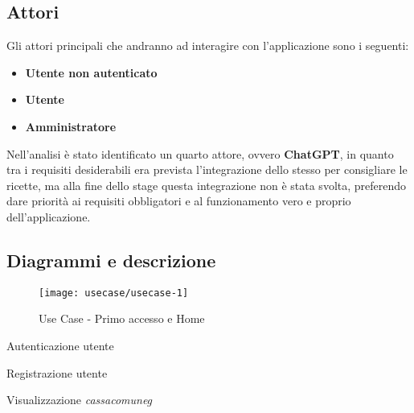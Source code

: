 \subsection{Attori}
Gli attori principali che andranno ad interagire con l'applicazione sono i seguenti:
\begin{itemize}
    \item \textbf{Utente non autenticato}
    \item \textbf{Utente}
    \item \textbf{Amministratore}
\end{itemize}
Nell'analisi è stato identificato un quarto attore, ovvero \textbf{ChatGPT}, in quanto tra i requisiti desiderabili era prevista l'integrazione dello stesso per consigliare le ricette, ma alla fine dello stage questa integrazione non è stata svolta, preferendo dare priorità ai requisiti obbligatori e al funzionamento vero e proprio dell'applicazione.

\newpage

\subsection{Diagrammi e descrizione}

\begin{figure}[!h] 
    \centering 
    \texttt{[image: usecase/usecase-1]} 
    \caption{Use Case - Primo accesso e Home}
\end{figure}

\begin{usecase}{1}{Autenticazione utente}
    \label{uc:autenticazione-utente}
\end{usecase}

\begin{usecase}{2}{Registrazione utente}
    \label{uc:registrazione-utente}
\end{usecase}

\begin{usecase}{3}{Visualizzazione \emph{\gls{cassacomuneg}}}
    \label{uc:visualizza-casacomune}
\end{usecase}

